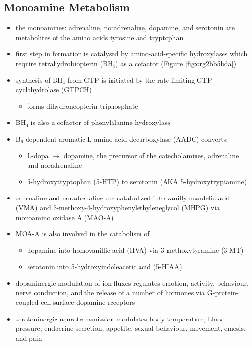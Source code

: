 \documentclass{scrartcl}
\begin{document}
\subsection{Monoamine Metabolism}
\label{sec:org21a954b}
\begin{itemize}
\item the monoamines: adrenaline, noradrenaline, dopamine, and serotonin
are metabolites of the amino acids tyrosine and tryptophan
\item first step in formation is catalysed by amino-acid-specific
hydroxylases which require tetrahydrobiopterin (BH\(_{\text{4}}\)) as a cofactor
(Figure \ref{fig:org2bb5bda})
\item synthesis of BH\(_{\text{4}}\) from GTP is initiated by the rate-limiting GTP
cyclohydrolase (GTPCH)
\begin{itemize}
\item forms dihydroneopterin triphosphate
\end{itemize}
\item BH\(_{\text{4}}\) is also a cofactor of phenylalanine hydroxylase
\item B\(_{\text{6}}\)-dependent aromatic L-amino acid decarboxylase (AADC) converts:
\begin{itemize}
\item L-dopa \(\to\) dopamine, the precursor of the catecholamines,
adrenaline and noradrenaline
\item 5-hydroxytryptophan (5-HTP) to serotonin (AKA 5-hydroxytryptamine)
\end{itemize}
\item adrenaline and noradrenaline are catabolized into vanillylmandelic
acid (VMA) and 3-methoxy-4-hydroxyphenylethyleneglycol (MHPG) via
monoamino oxidase A (MAO-A)
\item MOA-A is also involved in the catabolism of
\begin{itemize}
\item dopamine into homovanillic acid (HVA) via 3-methoxytyramine (3-MT)
\item serotonin into 5-hydroxyindoleacetic acid (5-HIAA)
\end{itemize}
\item dopaminergic modulation of ion fluxes regulates emotion, activity,
behaviour, nerve conduction, and the release of a number of hormones
via G-protein-coupled cell-surface dopamine
receptors
\item serotoninergic neurotransmission modulates body temperature, blood
pressure, endocrine secretion, appetite, sexual behaviour, movement,
emesis, and pain
\end{itemize}
\end{document}
